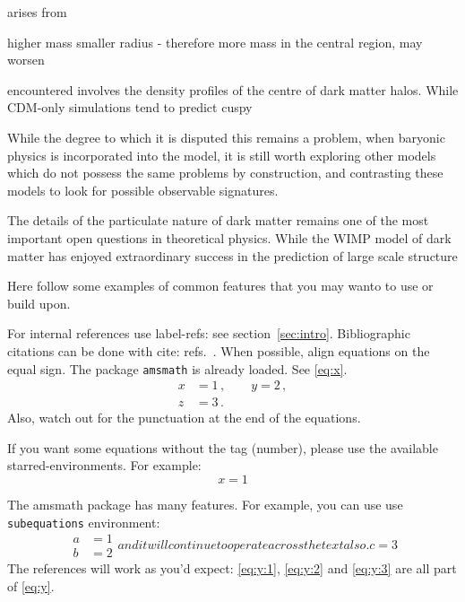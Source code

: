 \documentclass[a4paper,11pt]{article}
\begin{document}
arises from



higher mass smaller radius - therefore more mass in the central region, may worsen 



encountered involves the density profiles of the centre of dark matter halos. While CDM-only simulations tend to predict cuspy

While the degree to which it is disputed this remains a problem, when baryonic physics is incorporated into the model, it is still worth exploring other models which do not possess the same problems by construction, and contrasting these models to look for possible observable signatures.  



The details of the particulate nature of dark matter remains one of the most important open questions in theoretical physics. While the WIMP model of dark matter has enjoyed extraordinary success in the prediction of large scale structure \cite{REF}


Here follow some examples of common features that you may wanto to use
or build upon.

For internal references use label-refs: see section~\ref{sec:intro}.
Bibliographic citations can be done with cite: refs.~\cite{a,b,c}.
When possible, align equations on the equal sign. The package
\texttt{amsmath} is already loaded. See \eqref{eq:x}.
\begin{equation}
\label{eq:x}
\begin{split}
x &= 1 \,,
\qquad
y = 2 \,,
\\
z &= 3 \,.
\end{split}
\end{equation}
Also, watch out for the punctuation at the end of the equations.


If you want some equations without the tag (number), please use the available
starred-environments. For example:
\begin{equation*}
x = 1
\end{equation*}

The amsmath package has many features. For example, you can use use
\texttt{subequations} environment:
\begin{subequations}\label{eq:y}
\begin{align}
\label{eq:y:1}
a & = 1
\\
\label{eq:y:2}
b & = 2
\end{align}
and it will continue to operate across the text also.
\begin{equation}
\label{eq:y:3}
c = 3
\end{equation}
\end{subequations}
The references will work as you'd expect: \eqref{eq:y:1},
\eqref{eq:y:2} and \eqref{eq:y:3} are all part of \eqref{eq:y}.
\end{document}
